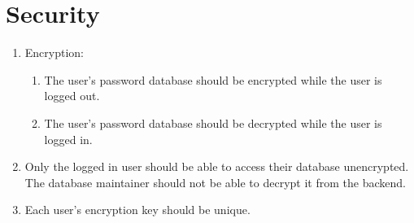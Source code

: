 \section{Security}
\begin{enumerate}[resume*]

    \item Encryption:
          \begin{enumerate}[label={\textbf{\arabic*.}}]
              \item The user's password database should be encrypted while the user is logged out.
              \item The user's password database should be decrypted while the user is logged in.
          \end{enumerate}
    \item Only the logged in user should be able to access their database unencrypted. The database maintainer should not be able to decrypt it from the backend.
    \item Each user's encryption key should be unique.

\end{enumerate}